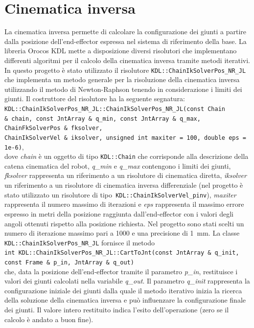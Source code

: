 \section{Cinematica inversa}
La cinematica inversa permette di calcolare la configurazione dei giunti a partire dalla posizione dell'end-effector espressa nel sistema di riferimento della base. La libreria Orocos 
KDL mette a disposizione diversi risolutori che implementano differenti algoritmi per il calcolo della cinematica inversa tramite metodi iterativi. In questo progetto è stato utilizzato il risolutore \texttt{KDL::ChainIkSolverPos\_NR\_JL} che implementa un metodo generale per la risoluzione della cinematica inversa utilizzando il metodo di Newton-Raphson tenendo in considerazione i limiti dei giunti. Il costruttore del risolutore ha la seguente segnatura: \\ \texttt{KDL::ChainIkSolverPos\_NR\_JL::ChainIkSolverPos\_NR\_JL(const Chain \&\ chain, const JntArray \&\ q\_min, const JntArray \&\ q\_max, ChainFkSolverPos \&\ fksolver, \\ ChainIkSolverVel \&\ iksolver, unsigned int	maxiter = 100, double eps = 1e-6)}, \\ dove \textit{chain} è un oggetto di tipo \texttt{KDL::Chain} che corrisponde alla descrizione della catena cinematica del robot, \textit{q\_min} e \textit{q\_max} contengono i limiti dei giunti, \textit{fksolver} rappresenta un riferimento a un risolutore di cinematica diretta, \textit{iksolver} un riferimento a un risolutore di cinematica inversa differenziale (nel progetto è stato utilizzato un risolutore di tipo\texttt{ KDL::ChainIkSolverVel\_pinv}), \textit{maxiter} rappresenta il numero massimo di iterazioni e \textit{eps} rappresenta il massimo errore espresso in metri della posizione raggiunta dall'end-effector con i valori degli angoli ottenuti rispetto alla posizione richiesta. Nel progetto sono stati scelti un numero di iterazione massimo pari a 1000 e una precisione di \SI{1}{\milli\meter}. 
La classe \texttt{KDL::ChainIkSolverPos\_NR\_JL} fornisce il metodo \\
\texttt{int KDL::ChainIkSolverPos\_NR\_JL::CartToJnt(const JntArray \&\ q\_init, const Frame \&\ p\_in, JntArray \&\	q\_out)} \\ che, data la posizione dell'end-effector tramite il parametro \textit{p\_in}, restituisce i valori dei giunti calcolati nella variabile \textit{q\_out}. Il parametro \textit{q\_init} rappresenta la configurazione iniziale dei giunti dalla quale il metodo iterativo inizia la ricerca della soluzione della cinematica inversa e può influenzare la configurazione finale dei giunti. Il valore intero restituito indica l'esito dell'operazione (zero se il calcolo è andato a buon fine).

